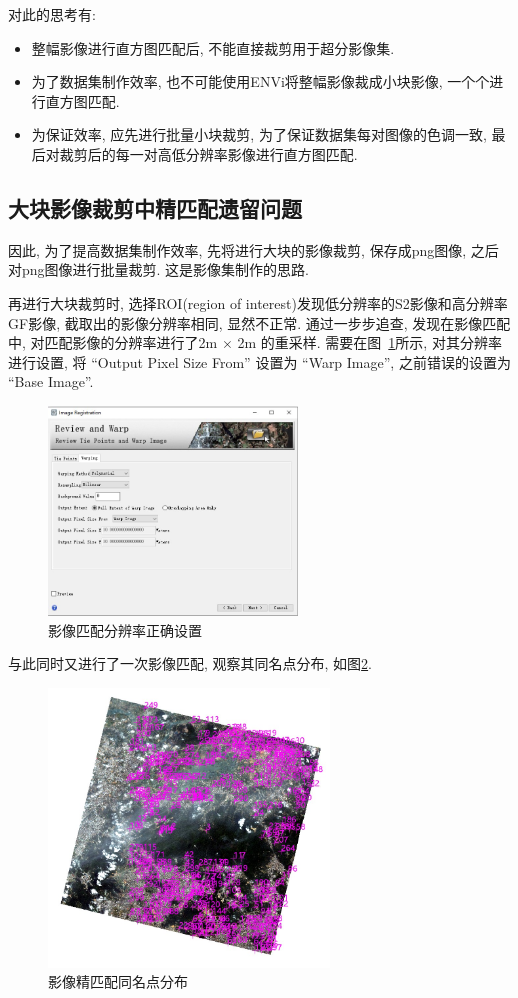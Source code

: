 对此的思考有: 
\begin{itemize}
    \item 整幅影像进行直方图匹配后, 不能直接裁剪用于超分影像集.
    \item 为了数据集制作效率, 也不可能使用ENVi将整幅影像裁成小块影像, 一个个进行直方图匹配. 
    \item 为保证效率, 应先进行批量小块裁剪, 为了保证数据集每对图像的色调一致, 最后对裁剪后的每一对高低分辨率影像进行直方图匹配.
\end{itemize}

\subsection{大块影像裁剪中精匹配遗留问题}
因此, 为了提高数据集制作效率, 先将进行大块的影像裁剪, 保存成png图像, 之后对png图像进行批量裁剪. 这是影像集制作的思路. 

再进行大块裁剪时, 选择ROI(region of interest)发现低分辨率的S2影像和高分辨率GF影像, 截取出的影像分辨率相同, 显然不正常. 通过一步步追查, 发现在影像匹配中, 对匹配影像的分辨率进行了2m $\times$ 2m 的重采样. 需要在图~\ref{fig:0209}所示, 对其分辨率进行设置, 将 ``Output Pixel Size From'' 设置为 ``Warp Image'', 之前错误的设置为 ``Base Image''.

\begin{figure}[!htbp]
    \centering
    \includegraphics[height=15em]{pic/q0202.jpg}
    \caption{影像匹配分辨率正确设置}
    \label{fig:0209}
\end{figure}

与此同时又进行了一次影像匹配, 观察其同名点分布, 如图\ref{fig:0210}.

\begin{figure}[!htbp]
    \centering
    \includegraphics[height=20em]{pic/q0201.jpg}
    \caption{影像精匹配同名点分布}
    \label{fig:0210}
\end{figure}

